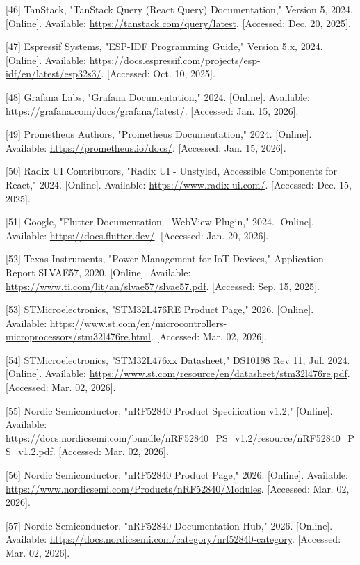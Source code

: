 \documentclass[13pt,a4paper]{extarticle}
\renewcommand{\\}{\thesislongtableorignewline\hline}%
\begin{document}
{[}46{]} TanStack, "TanStack Query (React Query) Documentation," Version
5, 2024. {[}Online{]}. Available:
\url{https://tanstack.com/query/latest}. {[}Accessed: Dec. 20, 2025{]}.

{[}47{]} Espressif Systems, "ESP-IDF Programming Guide," Version 5.x,
2024. {[}Online{]}. Available:
\url{https://docs.espressif.com/projects/esp-idf/en/latest/esp32s3/}.
{[}Accessed: Oct. 10, 2025{]}.

{[}48{]} Grafana Labs, "Grafana Documentation," 2024. {[}Online{]}.
Available: \url{https://grafana.com/docs/grafana/latest/}. {[}Accessed:
Jan. 15, 2026{]}.

{[}49{]} Prometheus Authors, "Prometheus Documentation," 2024.
{[}Online{]}. Available: \url{https://prometheus.io/docs/}. {[}Accessed:
Jan. 15, 2026{]}.

{[}50{]} Radix UI Contributors, "Radix UI - Unstyled, Accessible
Components for React," 2024. {[}Online{]}. Available:
\url{https://www.radix-ui.com/}. {[}Accessed: Dec. 15, 2025{]}.

{[}51{]} Google, "Flutter Documentation - WebView Plugin," 2024.
{[}Online{]}. Available: \url{https://docs.flutter.dev/}. {[}Accessed:
Jan. 20, 2026{]}.

{[}52{]} Texas Instruments, "Power Management for IoT Devices,"
Application Report SLVAE57, 2020. {[}Online{]}. Available:
\url{https://www.ti.com/lit/an/slvae57/slvae57.pdf}. {[}Accessed: Sep.
15, 2025{]}.

{[}53{]} STMicroelectronics, "STM32L476RE Product Page," 2026.
{[}Online{]}. Available:
\url{https://www.st.com/en/microcontrollers-microprocessors/stm32l476re.html}.
{[}Accessed: Mar. 02, 2026{]}.

{[}54{]} STMicroelectronics, "STM32L476xx Datasheet," DS10198 Rev 11,
Jul. 2024. {[}Online{]}. Available:
\url{https://www.st.com/resource/en/datasheet/stm32l476re.pdf}.
{[}Accessed: Mar. 02, 2026{]}.

{[}55{]} Nordic Semiconductor, "nRF52840 Product Specification v1.2,"
{[}Online{]}. Available:
\url{https://docs.nordicsemi.com/bundle/nRF52840_PS_v1.2/resource/nRF52840_PS_v1.2.pdf}.
{[}Accessed: Mar. 02, 2026{]}.

{[}56{]} Nordic Semiconductor, "nRF52840 Product Page," 2026.
{[}Online{]}. Available:
\url{https://www.nordicsemi.com/Products/nRF52840/Modules}. {[}Accessed:
Mar. 02, 2026{]}.

{[}57{]} Nordic Semiconductor, "nRF52840 Documentation Hub," 2026.
{[}Online{]}. Available:
\url{https://docs.nordicsemi.com/category/nrf52840-category}.
{[}Accessed: Mar. 02, 2026{]}.
\end{document}
